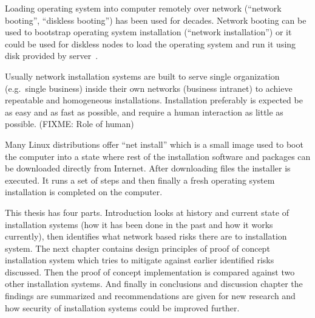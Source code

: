 
\iffalse
\begin{itemize}
\item FIXME: TODO REMOVE THIS LIST
\item INTRODUCTION: The Setting - bird eye's view - the challenge to be tackled / thing to be be improved in general
\item INTRODUCTION: Past research done
\item INTRODUCTION: Gap in knowledge/problem not yet solved
\item INTRODUCTION: Purpose and method of this work
\item INTRODUCTION: More detailed description what was done
\item INTRODUCTION: Results acquired
\item INTRODUCTION: Analysis and limitations of the result (Mostly relocate to Conclusions)
\item INTRODUCTION: Value (Mostly relocate to Conclusions)
\end{itemize}
\fi

Loading operating system into computer remotely over network
(``network booting'', ``diskless booting'') has been used for
decades. Network booting can be used to bootstrap operating system
installation (``network installation'') or it could be used for
diskless nodes to load the operating system and run it using disk
provided by server~\cite{anvin2008x86}.

Usually network installation systems are built to serve single
organization (e.g.\ single business) inside their own networks
(business intranet) to achieve repeatable and homogeneous
installations. Installation preferably is expected be as easy and as
fast as possible, and require a human interaction as little as
possible. (FIXME: Role of human)

Many Linux distributions offer ``net install'' which is a small image
used to boot the computer into a state where rest of the installation
software and packages can be downloaded directly from Internet. After
downloading files the installer is executed. It runs a set of steps
and then finally a fresh operating system installation is completed on
the computer.

This thesis has four parts. Introduction looks at history and current
state of installation systems (how it has been done in the past and
how it works currently), then identifies what network based risks
there are to installation system. The next chapter contains design
principles of proof of concept installation system which tries to
mitigate against earlier identified risks discussed. Then the proof of
concept implementation is compared against two other installation
systems. And finally in conclusions and discussion chapter the
findings are summarized and recommendations are given for new research
and how security of installation systems could be improved further.

